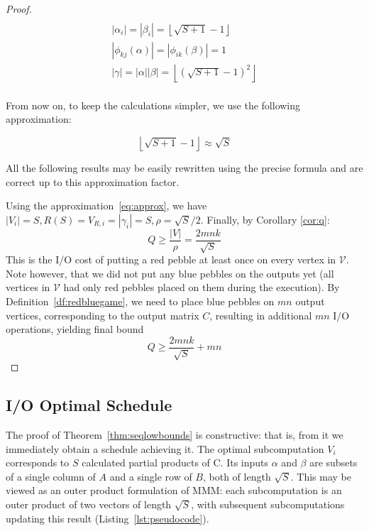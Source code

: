 \documentclass[sigplan,review,anonymous]{acmart}\settopmatter{printfolios=true,printccs=false,printacmref=false}
\begin{document}
\begin{proof}
\begin{multline}
\label{eq:seqSolution}
\\
|\alpha_i| = |\beta_i|= \left \lfloor{\sqrt{S + 1} - 1} \right \rfloor \\
|\phi_{kj}(\alpha)| = |\phi_{ik}(\beta)| = 1 \\
|\gamma| = |\alpha| |\beta| = \left \lfloor{(\sqrt{S + 1} - 1)^2} \right 
\rfloor 
\\
\end{multline}
 

 
From now on, to keep the calculations simpler, we use the following 
approximation:

\begin{equation}
\label{eq:approx}
\left \lfloor{\sqrt{S + 1} - 1} \right \rfloor \approx \sqrt{S}
\end{equation}

All the following results may be easily rewritten using the precise formula and
are correct up to this approximation factor.

Using the approximation~\ref{eq:approx}, we have $|V_i| = S, R(S) = V_{R,i} = 
|\gamma_i| = S, \rho =
\sqrt{S}/2$.
 Finally,  by Corollary \ref{cor:q}:  
 $$Q \ge
\frac{|V|}{\rho} = \frac{2mnk}{\sqrt{S}}$$ 
This is the I/O cost of putting a red pebble at least once on every vertex in 
$\mathcal{V}$. Note however, that we did not put any
blue pebbles on the outputs yet (all vertices in $\mathcal{V}$ had only red
pebbles placed on them during the execution). By
Definition~\ref{df:redbluegame}, we need to place blue pebbles on $mn$ output
vertices, corresponding to the output matrix $C$, resulting in additional $mn$
I/O operations, yielding final bound
 $$Q \ge \frac{2mnk}{\sqrt{S}} + mn$$ 
%
\end{proof}
 
\subsection{I/O Optimal Schedule}
\label{sec:seqScheduling}

The proof of Theorem~\ref{thm:seqlowbounds} is constructive:
that is, from it we immediately obtain a schedule achieving it. The optimal
subcomputation $V_i$ corresponds to $S$ calculated partial products of C. Its
inputs $\alpha$ and $\beta$ are subsets of a single column of $A$ and a single
row of $B$, both of length $\sqrt{S}$. This may be viewed as an outer product
formulation of MMM: each subcomputation is an outer product of two vectors of
length $\sqrt{S}$, with subsequent subcomputations updating this result
(Listing~\ref{lst:pseudocode}).
\end{document}
